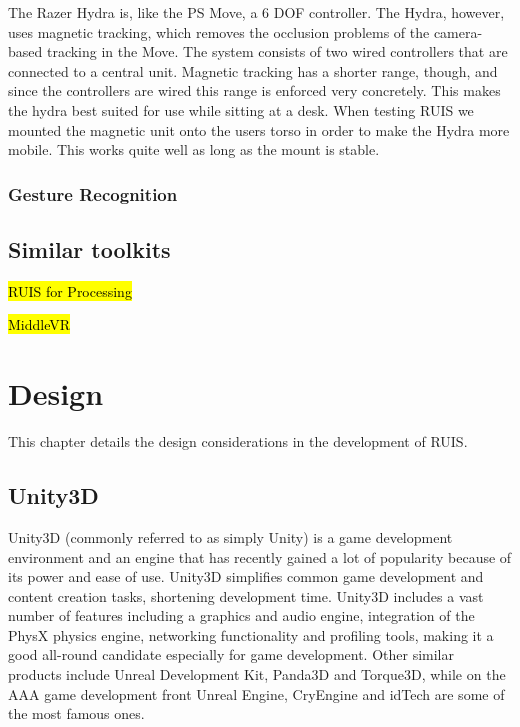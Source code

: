 \documentclass[12pt,a4paper,oneside,pdftex]{report}
\begin{document}
The Razer Hydra is, like the PS Move, a 6 DOF controller. The Hydra, however, uses magnetic tracking, which removes the occlusion problems of the camera-based tracking in the Move. The system consists of two wired controllers that are connected to a central unit. Magnetic tracking has a shorter range, though, and since the controllers are wired this range is enforced very concretely. This makes the hydra best suited for use while sitting at a desk. When testing RUIS we mounted the magnetic unit onto the users torso in order to make the Hydra more mobile. This works quite well as long as the mount is stable. 

\subsection{Gesture Recognition}
\label{subsection:motion:gesture}

\section{Similar toolkits}
\label{section:similar}

\hl{RUIS for Processing}

\hl{MiddleVR}




\chapter{Design}
\label{chapter:design}

This chapter details the design considerations in the development of RUIS.

\section{Unity3D}
\label{section:unity3d}

Unity3D (commonly referred to as simply Unity) \cite{UnitySite} is a game development environment and an engine that has recently gained a lot of popularity because of its power and ease of use. Unity3D simplifies common game development and content creation tasks, shortening development time. Unity3D includes a vast number of features including a graphics and audio engine, integration of the PhysX physics engine, networking functionality and profiling tools, making it a good all-round candidate especially for game development. Other similar products include Unreal Development Kit, Panda3D and Torque3D, while on the AAA game development front Unreal Engine, CryEngine and idTech are some of the most famous ones.
\end{document}

